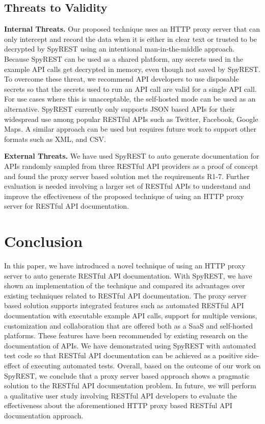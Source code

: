 \documentclass[conference]{IEEEtran}
\begin{document}
\subsection{Threats to Validity} %
\label{sub:threats_to_validity}

\textbf{Internal Threats.} Our proposed technique uses an HTTP proxy server that can only intercept and record the data when it is either in clear text or trusted to be decrypted by SpyREST using an intentional man-in-the-middle approach. Because SpyREST can be used as a shared platform, any secrets used in the example API calls get decrypted in memory, even though not saved by SpyREST. To overcome these threat, we recommend API developers to use disposable secrets so that the secrets used to run an API call are valid for a single API call. For use cases where this is unacceptable, the self-hosted mode can be used as an alternative. SpyREST currently only supports JSON based APIs for their widespread use among popular RESTful APIs such as Twitter, Facebook, Google Maps. A similar approach can be used but requires future work to support other formats such as XML, and CSV.

\textbf{External Threats.}  We have used SpyREST to auto generate documentation for APIs randomly sampled from three RESTful API providers as a proof of concept and found the proxy server based solution met the requirements R1-7. Further evaluation is needed involving a larger set of RESTful APIs to understand and improve the effectiveness of the proposed technique of using an HTTP proxy server for RESTful API documentation.

\section{Conclusion}
In this paper, we have introduced a novel technique of using an HTTP proxy server to auto generate RESTful API documentation. With SpyREST, we have shown an implementation of the technique and compared its advantages over existing techniques related to RESTful API documentation. The proxy server based solution supports integrated features such as automated RESTful API documentation with executable example API calls, support for multiple versions, customization and collaboration that are offered both as a SaaS and self-hosted platforms. These features have been recommended by existing research on the documentation of APIs. We have demonstrated using SpyREST with automated test code so that RESTful API documentation can be achieved as a positive side-effect of executing automated tests. Overall, based on the outcome of our work on SpyREST, we conclude that a proxy server based approach shows a pragmatic solution to the RESTful API documentation problem. In future, we will perform a qualitative user study involving RESTful API developers to evaluate the effectiveness about the aforementioned HTTP proxy based RESTful API documentation approach.


\end{document}
